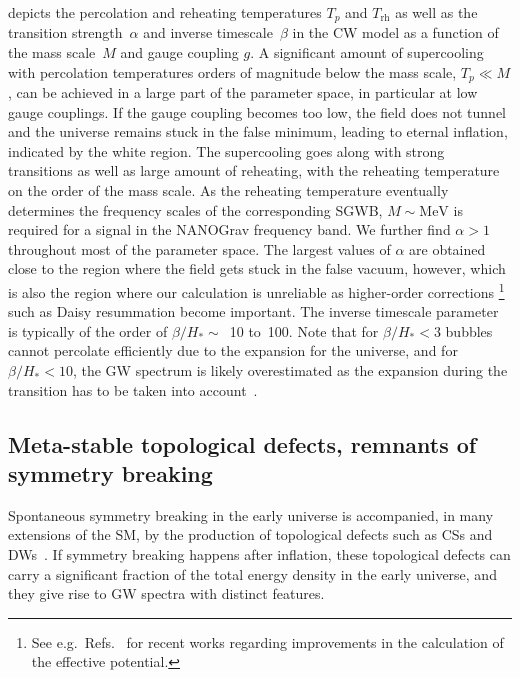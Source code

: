 \documentclass{article}
\newcommand*{\Trh}{\ensuremath{T_\mathrm{rh}}\xspace}
\begin{document}
 depicts the percolation and reheating temperatures $T_p$ and \Trh as well as the transition strength~$\alpha$ and inverse timescale~$\beta$ in the CW model as a function of the mass scale~$M$ and gauge coupling $g$. 
A significant amount of supercooling with percolation temperatures orders of magnitude below the mass scale, $T_p \ll M$, can be achieved in a large part of the parameter space, in particular at low gauge couplings.
If the gauge coupling becomes too low, the field does not tunnel and the universe remains stuck in the false minimum, leading to eternal inflation, indicated by the white region.
The supercooling goes along with strong transitions as well as large amount of reheating, with the reheating temperature on the order of the mass scale. 
As the reheating temperature eventually determines the frequency scales of the corresponding SGWB, $M\sim\si{\MeV}$ is required for a signal in the NANOGrav frequency band.
We further find $\alpha > 1$ throughout most of the parameter space.
The largest values of $\alpha$ are obtained close to the region where the field gets stuck in the false vacuum, however, which is also the region where our calculation is unreliable as higher-order corrections%
\footnote{See e.g.\ Refs.~\cite{Croon:2020cgk,Schicho:2022wty,Ekstedt:2022bff} for recent works regarding improvements in the calculation of the effective potential.}
such as Daisy resummation become important.
The inverse timescale parameter is typically of the order of $\beta/H_* \sim$~10 to~100.
Note that for $\beta/H_*<3$ bubbles cannot percolate efficiently due to the expansion for the universe, and for $\beta/H_*<10$, the GW spectrum is likely overestimated as the expansion during the transition has to be taken into account~\cite{Freese:2022qrl,Jinno:2022mie,Bringmann:2023opz}.

\subsection{Meta-stable topological defects, remnants of symmetry breaking}

Spontaneous symmetry breaking in the early universe is accompanied, in many extensions of the SM, by the production of topological defects such as CSs and DWs~\cite{Vilenkin:1984ib,Saikawa:2017hiv}.
If symmetry breaking happens after inflation, these topological defects can carry a significant fraction of the total energy density in the early universe, and they give rise to GW spectra with distinct features.
\end{document}
